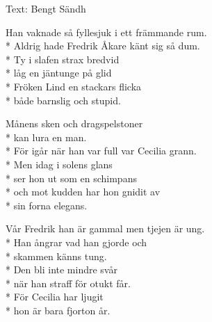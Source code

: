 \begin{SongText}
    \begin{SongInfo}
        Text: Bengt Sändh
    \end{SongInfo}
    \begin{SongVerse}
        Han vaknade så fyllesjuk i ett främmande rum.\\*%
        Aldrig hade Fredrik Åkare känt sig så dum.\\*%
        Ty i slafen strax bredvid\\*%
        låg en jäntunge på glid\\*%
        Fröken Lind en stackars flicka\\*%
        både barnslig och stupid.
    \end{SongVerse}
    \begin{SongVerse}
        Månens sken och dragspelstoner\\*%
        kan lura en man.\\*%
        För igår när han var full var Cecilia grann.\\*%
        Men idag i solens glans\\*%
        ser hon ut som en schimpans\\*%
        och mot kudden har hon gnidit av\\*%
        sin forna elegans.
    \end{SongVerse}
    \begin{SongVerse}
        Vår Fredrik han är gammal men tjejen är ung.\\*%
        Han ångrar vad han gjorde och\\*%
        skammen känns tung.\\*%
        Den bli inte mindre svår\\*%
        när han straff för otukt får.\\*%
        För Cecilia har ljugit\\*%
        hon är bara fjorton år.
    \end{SongVerse}
\end{SongText}
